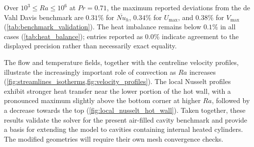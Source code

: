 \documentclass[preprint,3p,number]{elsarticle}
\begin{document}
Over $10^3\leq Ra\leq10^6$ at $Pr=0.71$, the maximum reported deviations from
the de Vahl Davis benchmark are $0.31\%$ for $\overline{Nu}_h$, $0.34\%$ for
$U_{\max}$, and $0.38\%$ for $V_{\max}$ (\cref{tab:benchmark_validation}).
The heat imbalance remains below $0.1\%$ in all cases
(\cref{tab:heat_balance}); entries reported as $0.0\%$ indicate agreement
to the displayed precision rather than necessarily exact equality.

The flow and temperature fields, together with the centreline velocity profiles,
illustrate the increasingly important role of convection as $Ra$ increases
(\cref{fig:streamlines_isotherms,fig:velocity_profiles}). The local Nusselt
profiles exhibit stronger heat transfer near the lower portion of the hot wall,
with a pronounced maximum slightly above the bottom corner at higher $Ra$,
followed by a decrease towards the top
(\cref{fig:local_nusselt_hot_wall}). Taken together, these results
validate the solver for the present air-filled cavity benchmark and provide a
basis for extending the model to cavities containing internal heated cylinders.
The modified geometries will require their own mesh convergence checks.


\end{document}
